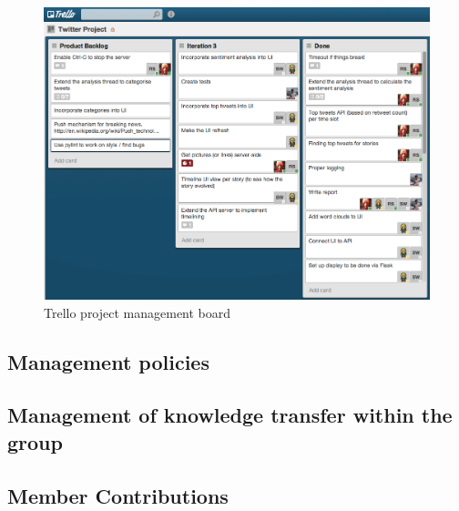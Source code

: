 \documentclass[a4paper,12pt]{article}
\begin{document}
			\begin{figure}[ht!]
						\centering
							\includegraphics[scale=0.4]{trello1.png}
						\caption{Trello project management board}
			\end{figure}

		
		\subsection{Management policies}
		
		\subsection{Management of knowledge transfer within the group}
	
	\subsection{Member Contributions}
\end{document}
